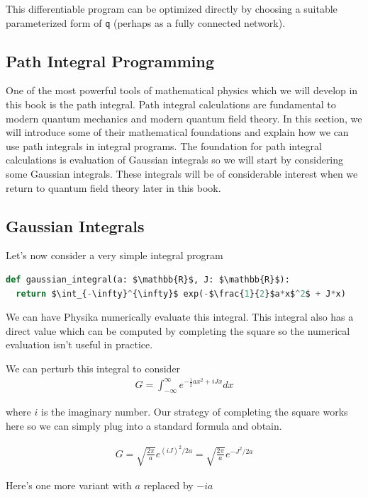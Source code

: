 \documentclass[book.tex]{subfiles}
\begin{document}
This differentiable program can be optimized directly by choosing a suitable parameterized form of \lstinline{q} (perhaps as a fully connected network).

\subsection{Path Integral Programming}

One of the most powerful tools of mathematical physics which we will develop in this book is the path integral. Path integral calculations are fundamental to modern quantum mechanics and modern quantum field theory. In this section, we will introduce some of their mathematical foundations and explain how we can use path integrals in integral programs. The foundation for path integral calculations is evaluation of Gaussian integrals so we will start by considering some Gaussian integrals. These integrals will be of considerable interest when we return to quantum field theory later in this book.

\subsection{Gaussian Integrals}


Let's now consider a very simple integral program

\begin{lstlisting}[language=python]
def gaussian_integral(a: $\mathbb{R}$, J: $\mathbb{R}$):
  return $\int_{-\infty}^{\infty}$ exp(-$\frac{1}{2}$a*x$^2$ + J*x)
\end{lstlisting}

We can have Physika numerically evaluate this integral. This integral also has a direct value which can be computed by completing the square so the numerical evaluation isn't useful in practice.

We can perturb this integral to consider 
\begin{align} G = \int_{-\infty}^{\infty} e^{-\frac{1}{2}ax^2 + iJ x} dx \end{align}

where $i$ is the imaginary number. Our strategy of completing the square works here so we can simply plug into a standard formula and obtain.

\begin{align} G = \sqrt{\frac{2 \pi}{a}} e^{(iJ)^2/2a} = \sqrt{\frac{2 \pi}{a}} e^{-J^2/2a} \end{align}

Here's one more variant with $a$ replaced by $-ia$
\end{document}
